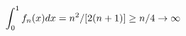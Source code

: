 \documentclass[preview]{standalone}
\begin{document}
\begin{align*}
\special{dvisvgm:raw <g id='unique000'>}\int_0^1f_n(x)dx=n^2/[2(n+1)]\ge n/4\to\infty\special{dvisvgm:raw </g>}
\end{align*}
\end{document}
